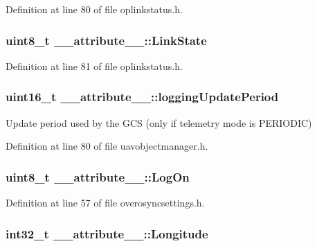 \-Definition at line 80 of file oplinkstatus.\-h.

\hypertarget{struct____attribute_____a62ebb85b9d2a7bac6a89d2b801933cdc}{
\subsubsection[{\-Link\-State}]{\setlength{\rightskip}{0pt plus 5cm}uint8\-\_\-t {\bf \-\_\-\-\_\-attribute\-\_\-\-\_\-\-::\-Link\-State}}}\label{struct____attribute_____a62ebb85b9d2a7bac6a89d2b801933cdc}


\-Definition at line 81 of file oplinkstatus.\-h.

\hypertarget{struct____attribute_____a85a81b55d67790a728b95eee989f17ed}{
\subsubsection[{logging\-Update\-Period}]{\setlength{\rightskip}{0pt plus 5cm}uint16\-\_\-t {\bf \-\_\-\-\_\-attribute\-\_\-\-\_\-\-::logging\-Update\-Period}}}\label{struct____attribute_____a85a81b55d67790a728b95eee989f17ed}
\-Update period used by the \-G\-C\-S (only if telemetry mode is \-P\-E\-R\-I\-O\-D\-I\-C) 

\-Definition at line 80 of file uavobjectmanager.\-h.

\hypertarget{struct____attribute_____aecd8cdce63308b584ce692e0fb67a233}{
\subsubsection[{\-Log\-On}]{\setlength{\rightskip}{0pt plus 5cm}uint8\-\_\-t {\bf \-\_\-\-\_\-attribute\-\_\-\-\_\-\-::\-Log\-On}}}\label{struct____attribute_____aecd8cdce63308b584ce692e0fb67a233}


\-Definition at line 57 of file overosyncsettings.\-h.

\hypertarget{struct____attribute_____a62a5344a3012ae4a6b572825cc0431e1}{
\subsubsection[{\-Longitude}]{\setlength{\rightskip}{0pt plus 5cm}int32\-\_\-t {\bf \-\_\-\-\_\-attribute\-\_\-\-\_\-\-::\-Longitude}}}\label{struct____attribute_____a62a5344a3012ae4a6b572825cc0431e1}


